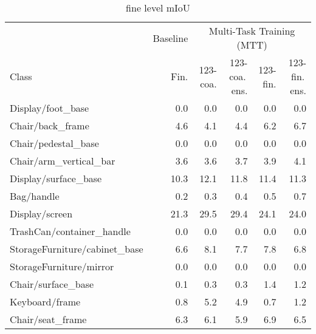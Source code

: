\begin{table}[!h]
\caption{fine level mIoU}
\centering
\begin{tabular}{lrrrrr}
\toprule
 &  \multicolumn{1}{c}{Baseline} & \multicolumn{4}{c}{Multi-Task Training (MTT)} \\
 \cmidrule{3-6}
Class 			  &  	 Fin. &  	123-coa. &  		123-coa.\,ens. &  	  123-fin. &  123-fin.\,ens. \\
\midrule
Display/foot\_base              &            0.0 &             0.0 &                     0.0 &           0.0 &                   0.0 \\
Chair/back\_frame               &            4.6 &             4.1 &                     4.4 &           6.2 &                   6.7 \\
Chair/pedestal\_base            &            0.0 &             0.0 &                     0.0 &           0.0 &                   0.0 \\
Chair/arm\_vertical\_bar         &            3.6 &             3.6 &                     3.7 &           3.9 &                   4.1 \\
Display/surface\_base           &           10.3 &            12.1 &                    11.8 &          11.4 &                  11.3 \\
Bag/handle                     &            0.2 &             0.3 &                     0.4 &           0.5 &                   0.7 \\
Display/screen                 &           21.3 &            29.5 &                    29.4 &          24.1 &                  24.0 \\
TrashCan/container\_handle      &            0.0 &             0.0 &                     0.0 &           0.0 &                   0.0 \\
StorageFurniture/cabinet\_base  &            6.6 &             8.1 &                     7.7 &           7.8 &                   6.8 \\
StorageFurniture/mirror        &            0.0 &             0.0 &                     0.0 &           0.0 &                   0.0 \\
Chair/surface\_base             &            0.1 &             0.3 &                     0.3 &           1.4 &                   1.2 \\
Keyboard/frame                 &            0.8 &             5.2 &                     4.9 &           0.7 &                   1.2 \\
Chair/seat\_frame               &            6.3 &             6.1 &                     5.9 &           6.9 &                   6.5 \\

\end{tabular}
\end{table}
